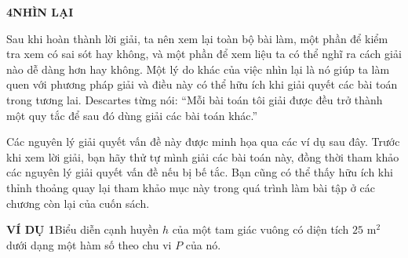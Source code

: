 \vspace{0.35cm}

\noindent
\begin{minipage}[t]{0.26\textwidth}
    \vspace{0pt}%
    \begin{tcolorbox}[
        nobeforeafter,
        colback=stewartpurple!15,
        colframe=stewartpurple!15,
        arc=0mm,
        top=1.2mm, bottom=1.2mm, left=2mm, right=2mm,
        boxrule=0pt
    ]
        \textbf{\textsf{\color{stewartpurple}4\quad NHÌN LẠI}}
    \end{tcolorbox}
\end{minipage}%
\hfill
\begin{minipage}[t]{0.71\textwidth}
    \vspace{0pt}%
    \noindent Sau khi hoàn thành lời giải, ta nên xem lại toàn bộ bài làm, một phần để kiểm tra xem có sai sót hay không, và một phần để xem liệu ta có thể nghĩ ra cách giải nào dễ dàng hơn hay không. Một lý do khác của việc nhìn lại là nó giúp ta làm quen với phương pháp giải và điều này có thể hữu ích khi giải quyết các bài toán trong tương lai. Descartes từng nói: “Mỗi bài toán tôi giải được đều trở thành một quy tắc để sau đó dùng giải các bài toán khác.”

    \vspace{0.25cm}
    \noindent Các nguyên lý giải quyết vấn đề này được minh họa qua các ví dụ sau đây. Trước khi xem lời giải, bạn hãy thử tự mình giải các bài toán này, đồng thời tham khảo các nguyên lý giải quyết vấn đề nếu bị bế tắc. Bạn cũng có thể thấy hữu ích khi thỉnh thoảng quay lại tham khảo mục này trong quá trình làm bài tập ở các chương còn lại của cuốn sách.

    \vspace{0.35cm}
    \noindent\textbf{\textsf{\color{stewartcyan}VÍ DỤ 1}}\quad Biểu diễn cạnh huyền $h$ của một tam giác vuông có diện tích $25\text{ m}^2$ dưới dạng một hàm số theo chu vi $P$ của nó.
\end{minipage}

\vspace{0.35cm}

